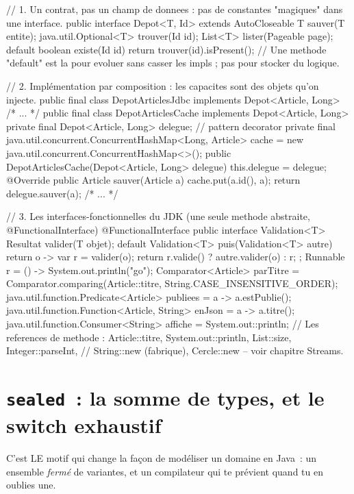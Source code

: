 \documentclass[12pt,a4paper,twoside,openright]{book}
\begin{document}
\begin{codejava}
// 1. Un contrat, pas un champ de donnees : pas de constantes "magiques" dans une interface.
public interface Depot<T, Id> extends AutoCloseable {
    T sauver(T entite);
    java.util.Optional<T> trouver(Id id);
    List<T> lister(Pageable page);
    default boolean existe(Id id) { return trouver(id).isPresent(); }
    // Une methode "default" est la pour evoluer sans casser les impls ; pas pour stocker du logique.
}

// 2. Impl\'ementation par composition : les capacites sont des objets qu'on injecte.
public final class DepotArticlesJdbc implements Depot<Article, Long> { /* ... */ }
public final class DepotArticlesCache implements Depot<Article, Long> {
    private final Depot<Article, Long> delegue;          // pattern decorator
    private final java.util.concurrent.ConcurrentHashMap<Long, Article> cache = new java.util.concurrent.ConcurrentHashMap<>();
    public DepotArticlesCache(Depot<Article, Long> delegue) { this.delegue = delegue; }
    @Override public Article sauver(Article a) { cache.put(a.id(), a); return delegue.sauver(a); }
    /* ... */
}

// 3. Les interfaces-fonctionnelles du JDK (une seule methode abstraite, @FunctionalInterface)
@FunctionalInterface
public interface Validation<T> {
    Resultat valider(T objet);
    default Validation<T> puis(Validation<T> autre) {
        return o -> { var r = valider(o); return r.valide() ? autre.valider(o) : r; };
    }
}
Runnable r = () -> System.out.println("go");
Comparator<Article> parTitre = Comparator.comparing(Article::titre, String.CASE_INSENSITIVE_ORDER);
java.util.function.Predicate<Article> publiees = a -> a.estPublie();
java.util.function.Function<Article, String> enJson = a -> a.titre();
java.util.function.Consumer<String> affiche = System.out::println;
// Les references de methode : Article::titre, System.out::println, List::size, Integer::parseInt,
// String::new (fabrique), Cercle::new -- voir chapitre Streams.
\end{codejava}

\section{\texttt{sealed}~: la somme de types, et le switch exhaustif}

C'est LE motif qui change la fa\c{c}on de mod\'eliser un domaine en Java~: un ensemble \emph{ferm\'e}
de variantes, et un compilateur qui te pr\'evient quand tu en oublies une.
\end{document}
